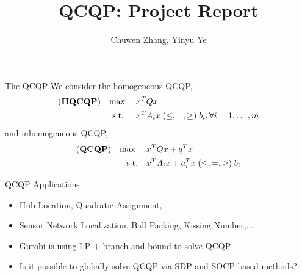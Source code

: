 \documentclass[aspectratio=1610, 10pt]{beamer}
\newcommand{\model}[1]{(\textbf{#1})}
\newcommand{\mx}{\mathbf{\max}\;}
\begin{document}
\title{QCQP: Project Report}

\author{
  Chuwen Zhang, Yinyu Ye
}


\maketitle
\begin{frame}{The QCQP}
  We consider the homogeneous QCQP,
  \begin{equation}
    \begin{aligned}
      \model{HQCQP} \quad \mx \quad & x^T Qx                                  \\
      \text{s.t. } \quad            & x^T A_i x \hspace{0.27em} (\le, =, \ge)
      \hspace{0.27em} b_i, \forall i = 1, \ldots, m                           \\
    \end{aligned}
  \end{equation}
  and inhomogeneous QCQP,
  \begin{equation}
    \label{eq:inhoqcqp}
    \begin{aligned}
      \model{QCQP} \quad \mx \quad & x^T Qx + q^T x                                    \\
      \textrm{s.t.} \quad          & x^T A_i x + a_i^T x \hspace{0.27em} (\le, =, \ge)
      \hspace{0.27em} b_i
    \end{aligned}
  \end{equation}
\end{frame}
\begin{frame}{QCQP Applications}
  \begin{itemize}
    \item Hub-Location, Quadratic Assignment,
    \item Sensor Network Localization, Ball Packing, Kissing Number,...
    \item Gurobi is using LP + branch and bound to solve QCQP
    \item Is it possible to globally solve QCQP via SDP and SOCP based methods?
  \end{itemize}
\end{frame}
\end{document}

